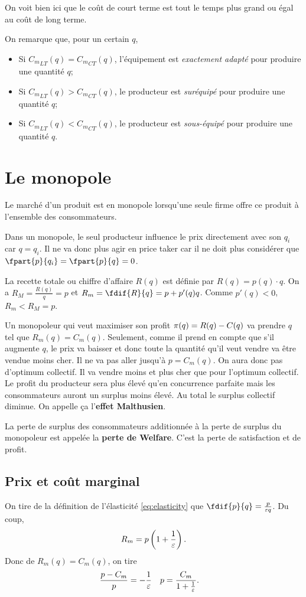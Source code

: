 On voit bien ici que
le coût de court terme est tout le temps plus grand ou égal
au coût de long terme.

On remarque que, pour un certain $q$,
\begin{itemize}
  \item Si ${C_m}_{LT}(q) = {C_m}_{CT}(q)$,
    l'équipement est \emph{exactement adapté} pour produire une quantité $q$;
  \item Si ${C_m}_{LT}(q) > {C_m}_{CT}(q)$,
    le producteur est \emph{suréquipé} pour produire une quantité $q$;
  \item Si ${C_m}_{LT}(q) < {C_m}_{CT}(q)$,
    le producteur est \emph{sous-équipé} pour produire une quantité $q$.
\end{itemize}

\section{Le monopole}
Le marché d'un produit est en monopole lorsqu'une seule firme
offre ce produit à l'ensemble des consommateurs.

Dans un monopole,
le seul producteur influence le prix directement avec son $q_i$ car $q = q_i$.
Il ne va donc plus agir en price taker car il ne doit plus
considérer que $\fpart{p}{q_i} = \fpart{p}{q} = 0$.

La recette totale ou chiffre d'affaire $R(q)$ est définie par
$R(q) = p(q) \cdot q$.
On a $R_M = \frac{R(q)}{q} = p$ et $R_m = \fdif{R}{q} = p + p'(q)q$.
Comme $p'(q) < 0$, $R_m < R_M = p$.

Un monopoleur qui veut maximiser son profit $\pi(q) = R(q) - C(q)$
va prendre $q$ tel que $R_m(q) = C_m(q)$.
Seulement, comme il prend en compte que s'il augmente $q$,
le prix va baisser et donc toute la quantité qu'il veut vendre va être vendue
moins cher.
Il ne va pas aller jusqu'à $p = C_m(q)$. On aura donc pas d'optimum collectif.
Il va vendre moins et plus cher que pour l'optimum collectif.
Le profit du producteur sera plus élevé qu'en concurrence parfaite mais
les consommateurs auront un surplus moins élevé.
Au total le surplus collectif diminue.
On appelle ça l'\textbf{effet Malthusien}.

La perte de surplus des consommateurs additionnée à la perte de surplus
du monopoleur est appelée la \textbf{perte de Welfare}.
C'est la perte de satisfaction et de profit.

\subsection{Prix et coût marginal}
On tire de la définition de l'élasticité \eqref{eq:elasticity} que
$\fdif{p}{q} = \frac{p}{\elasticity q}$. Du coup,
\[ R_m = p\left(1+\frac{1}{\varepsilon}\right). \]
Donc de $R_m(q) = C_m(q)$, on tire
\begin{align*}
  \frac{p-C_m}{p} & = -\frac{1}{\varepsilon} &
  p & = \frac{C_m}{1+\frac{1}{\varepsilon}}.
\end{align*}

